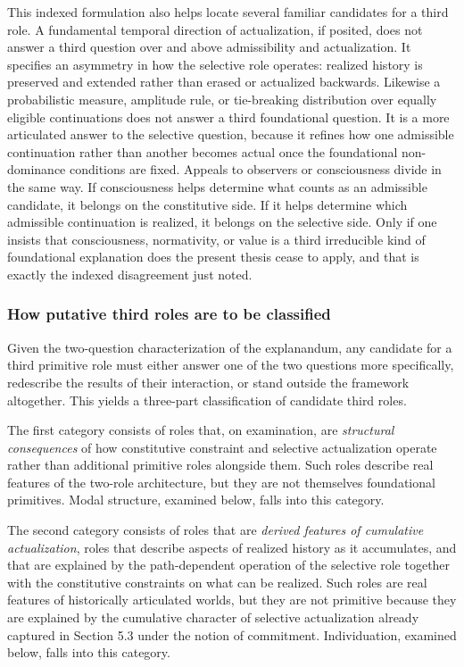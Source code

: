 \documentclass[11pt]{article}
\theoremstyle{foundation}
\begin{document}
This indexed formulation also helps locate several familiar candidates for a third role. A fundamental temporal direction of actualization, if posited, does not answer a third question over and above admissibility and actualization. It specifies an asymmetry in how the selective role operates: realized history is preserved and extended rather than erased or actualized backwards. Likewise a probabilistic measure, amplitude rule, or tie-breaking distribution over equally eligible continuations does not answer a third foundational question. It is a more articulated answer to the selective question, because it refines how one admissible continuation rather than another becomes actual once the foundational non-dominance conditions are fixed. Appeals to observers or consciousness divide in the same way. If consciousness helps determine what counts as an admissible candidate, it belongs on the constitutive side. If it helps determine which admissible continuation is realized, it belongs on the selective side. Only if one insists that consciousness, normativity, or value is a third irreducible kind of foundational explanation does the present thesis cease to apply, and that is exactly the indexed disagreement just noted.

\subsubsection{How putative third roles are to be classified}

Given the two-question characterization of the explanandum, any candidate for a third primitive role must either answer one of the two questions more specifically, redescribe the results of their interaction, or stand outside the framework altogether. This yields a three-part classification of candidate third roles.

The first category consists of roles that, on examination, are \emph{structural consequences} of how constitutive constraint and selective actualization operate rather than additional primitive roles alongside them. Such roles describe real features of the two-role architecture, but they are not themselves foundational primitives. Modal structure, examined below, falls into this category.

The second category consists of roles that are \emph{derived features of cumulative actualization}, roles that describe aspects of realized history as it accumulates, and that are explained by the path-dependent operation of the selective role together with the constitutive constraints on what can be realized. Such roles are real features of historically articulated worlds, but they are not primitive because they are explained by the cumulative character of selective actualization already captured in Section 5.3 under the notion of commitment. Individuation, examined below, falls into this category.
\end{document}
